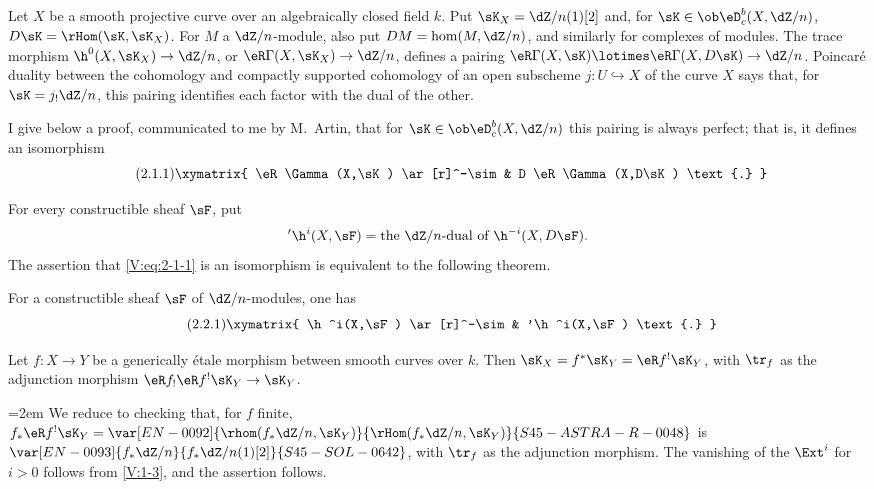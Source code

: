\subsection{}\label{V:2-1}

Let $X$ be a smooth projective curve over an algebraically closed field $k$.
Put $\sK_X=\dZ/n(1)[2]$ and, for $\sK\in\ob \eD_c^b(X,\dZ/n)$,
$D\sK=\rHom(\sK,\sK_X)$. For $M$ a $\dZ/n$-module, also put
$D M = \hom(M,\dZ/n)$, and similarly for complexes of modules. The trace
morphism $\h^0(X,\sK_X) \to \dZ/n$, or
$\eR\Gamma(X,\sK_X)\to \dZ/n$, defines a pairing
$\eR\Gamma(X,\sK)\lotimes\eR\Gamma(X,D\sK) \to \dZ/n$. Poincaré duality
between the cohomology and compactly supported cohomology of an open
subscheme $j:U\hookrightarrow X$ of the curve $X$ says that, for
$\sK=j_!\dZ/n$, this pairing identifies each factor with the dual of the
other.

I give below a proof, communicated to me by M.\ Artin, that for
$\sK\in\ob\eD_c^b(X,\dZ/n)$ this pairing is always perfect; that is, it
defines an isomorphism
\begin{equation*}\tag{2.1.1}\label{V:eq:2-1-1}
\xymatrix{
  \eR\Gamma(X,\sK) \ar[r]^-\sim
    & D \eR\Gamma(X,D\sK) \text{.}
}
\end{equation*}

For every constructible sheaf $\sF$, put
\[
  '\h^i(X,\sF) = \text{the $\dZ/n$-dual of $\h^{-i}(X,D\sF)$.}
\]
The assertion that \eqref{V:eq:2-1-1} is an isomorphism is equivalent to the
following theorem.


\begin{theorem_}\label{V:2-2}
For a constructible sheaf $\sF$ of $\dZ/n$-modules, one has
\begin{equation*}\tag{2.2.1}\label{V:eq:2-2-1}
\xymatrix{
  \h^i(X,\sF) \ar[r]^-\sim
    & '\h^i(X,\sF) \text{.}
}
\end{equation*}
\end{theorem_}


\begin{lemma_}\label{V:2-3}
Let $f:X\to Y$ be a generically étale morphism between smooth curves over
$k$. Then $\sK_X=f^\ast\sK_Y=\eR f^!\sK_Y$, with $\tr_f$ as the adjunction
morphism $\eR f_!\eR f^!\sK_Y\to \sK_Y$.
\end{lemma_}

\begingroup
\emergencystretch=2em\relax
We reduce to checking that, for $f$ finite,
$f_\ast \eR f^!\sK_Y = \var[EN-0092]{\rhom(f_\ast\dZ/n,\sK_Y)}{\rHom(f_\ast\dZ/n,\sK_Y)}{S45-ASTRA-R-0048}$ is $\var[EN-0093]{f_\ast\dZ/n}{f_\ast\dZ/n(1)[2]}{S45-SOL-0642}$, with $\tr_f$ as the adjunction morphism. The vanishing of the $\Ext^i$ for $i>0$
follows from \ref{V:1-3}, and the assertion follows.\par
\endgroup

